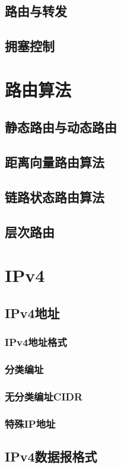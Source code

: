 \documentclass[lang=cn,newtx,10pt,scheme=chinese]{../../elegantbook}
\begin{document}
\subsection{路由与转发}
\subsection{拥塞控制}

\section{路由算法}
\subsection{静态路由与动态路由}
\subsection{距离向量路由算法}
\subsection{链路状态路由算法}
\subsection{层次路由}

\section{IPv4}
\subsection{IPv4地址}
\subsubsection{IPv4地址格式}
\subsubsection{分类编址}
\subsubsection{无分类编址CIDR}
\subsubsection{特殊IP地址}
\subsection{IPv4数据报格式}
\end{document}

